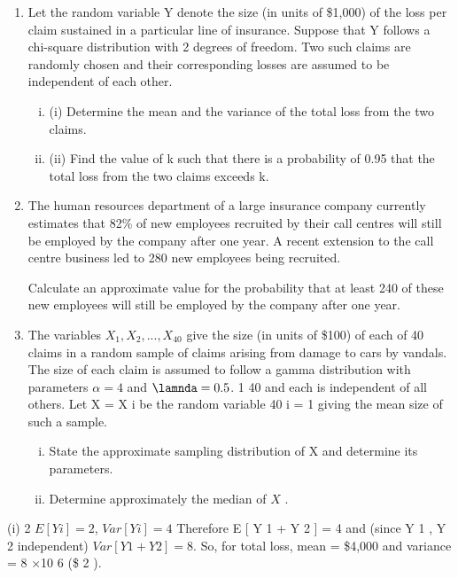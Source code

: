 \documentclass[a4paper,12pt]{article}
\begin{document}
\begin{enumerate}
\item 
Let the random variable Y denote the size (in units of \$1,000) of the loss per claim sustained in a particular line of insurance. Suppose that Y follows a chi-square distribution with 2 degrees of freedom. Two such claims are randomly chosen and
their corresponding losses are assumed to be independent of each other.
\begin{enumerate}[(i)]
\item (i) Determine the mean and the variance of the total loss from the two claims. 
\item (ii) Find the value of k such that there is a probability of 0.95 that the total loss from the two claims exceeds k.
\end{enumerate}
\item 
The human resources department of a large insurance company currently estimates that 82\% of new employees recruited by their call centres will still be employed by the company after one year. A recent extension to the call centre business led to 280
new employees being recruited.

Calculate an approximate value for the probability that at least 240 of these new employees will still be employed by the company after one year.
\item The variables $X_1 , X_2 , ..., X_{40}$ give the size (in units of \$100) of each of 40 claims in a random sample of claims arising from damage to cars by vandals. The size of each claim is assumed to follow a gamma distribution with parameters $\alpha = 4$ and $\lamnda = 0.5$.
1 40
and each is independent of all others. Let X =
\sigma X i be the random variable
40 i = 1
giving the mean size of such a sample.
\begin{enumerate}[(i)]
\item 
State the approximate sampling distribution of X and determine its parameters.
\item 
Determine approximately the median of $X$ .
\end{enumerate}
\end{enumerate}
(i)
2
$E [ Y i ] = 2$, $Var [ Y i ] = 4$
Therefore E [ Y 1 + Y 2 ] = 4 and (since Y 1 , Y 2 independent) $Var [ Y 1 + Y 2 ] = 8$.
So, for total loss, mean = \$4,000 and variance = 8 ×10 6 (\$ 2 ).
\end{document}
